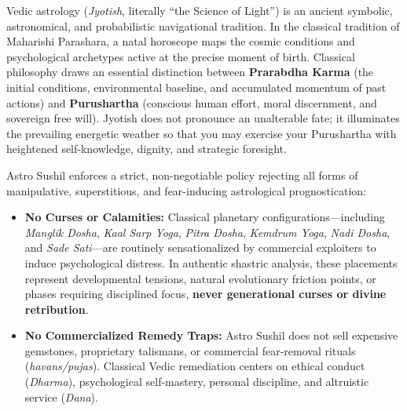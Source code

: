 \clearpage
{}
\label{disclaimersec}


\begin{executivecard}
  {\fontsize{8.5}{12}\selectfont
  Vedic astrology (\textit{Jyotish}, literally ``the Science of Light'') is an ancient symbolic, astronomical, and probabilistic navigational tradition. In the classical tradition of Maharishi Parashara, a natal horoscope maps the cosmic conditions and psychological archetypes active at the precise moment of birth. Classical philosophy draws an essential distinction between \textbf{Prarabdha Karma} (the initial conditions, environmental baseline, and accumulated momentum of past actions) and \textbf{Purushartha} (conscious human effort, moral discernment, and sovereign free will). Jyotish does not pronounce an unalterable fate; it illuminates the prevailing energetic weather so that you may exercise your Purushartha with heightened self-knowledge, dignity, and strategic foresight.\par}
\end{executivecard}

\vspace{1.5mm}
\begin{advisorycard}
  {\fontsize{8.5}{11.8}\selectfont
  Astro Sushil enforces a strict, non-negotiable policy rejecting all forms of manipulative, superstitious, and fear-inducing astrological prognostication:
  \begin{itemize}[leftmargin=*,itemsep=1.5pt,parsep=0pt]
    \item \textbf{No Curses or Calamities:} Classical planetary configurations---including \textit{Manglik Dosha}, \textit{Kaal Sarp Yoga}, \textit{Pitra Dosha}, \textit{Kemdrum Yoga}, \textit{Nadi Dosha}, and \textit{Sade Sati}---are routinely sensationalized by commercial exploiters to induce psychological distress. In authentic shastric analysis, these placements represent developmental tensions, natural evolutionary friction points, or phases requiring disciplined focus, \textbf{never generational curses or divine retribution}.
    \item \textbf{No Commercialized Remedy Traps:} Astro Sushil does not sell expensive gemstones, proprietary talismans, or commercial fear-removal rituals (\textit{havans/pujas}). Classical Vedic remediation centers on ethical conduct (\textit{Dharma}), psychological self-mastery, personal discipline, and altruistic service (\textit{Dana}).
  \end{itemize}\par}
\end{advisorycard}

